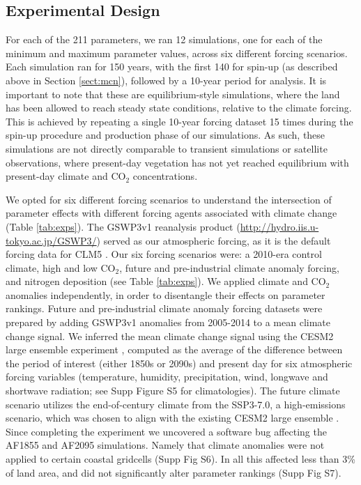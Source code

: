 \documentclass[draft]{agujournal2019}
\begin{document}
\subsection{Experimental Design}
\label{sect:exp}
For each of the 211 parameters, we ran 12 simulations, one for each of the minimum and maximum parameter values, across six different forcing scenarios. Each simulation ran for 150 years, with the first 140 for spin-up (as described above in Section \ref{sect:mcn}), followed by a 10-year period for analysis. It is important to note that these are equilibrium-style simulations, where the land has been allowed to reach steady state conditions, relative to the climate forcing. This is achieved by repeating a single 10-year forcing dataset 15 times during the spin-up procedure and production phase of our simulations. As such, these simulations are not directly comparable to transient simulations or satellite observations, where present-day vegetation has not yet reached equilibrium with present-day climate and CO$_2$ concentrations.

 We opted for six different forcing scenarios to understand the intersection of parameter effects with different forcing agents associated with climate change (Table \ref{tab:exps}). The GSWP3v1 reanalysis product (\url{http://hydro.iis.u-tokyo.ac.jp/GSWP3/}) served as our atmospheric forcing, as it is the default forcing data for CLM5 \cite{lawrence2019}. Our six forcing scenarios were: a 2010-era control climate, high and low CO$_2$, future and pre-industrial climate anomaly forcing, and  nitrogen deposition (see Table \ref{tab:exps}).  We applied climate and CO$_2$ anomalies independently, in order to disentangle their effects on parameter rankings. Future and pre-industrial climate anomaly forcing datasets were prepared by adding GSWP3v1 anomalies from 2005-2014 to a mean climate change signal. We inferred the mean climate change signal using the CESM2 large ensemble experiment \cite{rodgers2021}, computed as the average of the difference between the period of interest (either 1850s or 2090s) and present day for six atmospheric forcing variables (temperature, humidity, precipitation, wind, longwave and shortwave radiation; see Supp Figure S5 for climatologies). The future climate scenario utilizes the end-of-century climate from the SSP3-7.0, a high-emissions scenario, which was chosen to align with the existing CESM2 large ensemble \cite{rodgers2021}. Since completing the experiment we uncovered a software bug affecting the AF1855 and AF2095 simulations. Namely that climate anomalies were not applied to certain coastal gridcells (Supp Fig S6). In all this affected less than 3\% of land area, and did not significantly alter parameter rankings (Supp Fig S7).  
\end{document}

